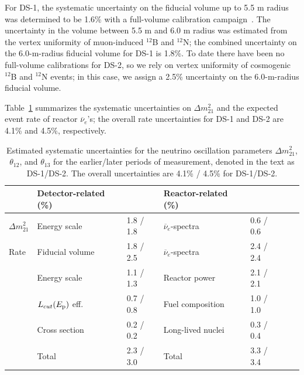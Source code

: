 \documentclass[aps,prc,twocolumn,groupedaddress,showpacs,amsmath,amssymb,floatfix,superscriptaddress]{revtex4}
\begin{document}
For \mbox{DS-1}, the systematic uncertainty on the fiducial volume up to 5.5 m radius was determined to be 1.6\% with a full-volume calibration campaign~\cite{Bruce2009}.  The uncertainty in the volume between 5.5 m and 6.0 m radius was estimated from the vertex uniformity of muon-induced $^{12}$B and $^{12}$N; the combined uncertainty on the 6.0-m-radius fiducial volume for \mbox{DS-1} is 1.8\%.  To date there have been no full-volume calibrations for \mbox{DS-2}, so we rely on vertex uniformity of cosmogenic $^{12}$B and $^{12}$N events; in this case, we assign a 2.5\% uncertainty on the 6.0-m-radius fiducial volume. 

Table~\ref{table:systematic} summarizes the systematic uncertainties on $\Delta m^{2}_{21}$ and the expected event rate of reactor $\overline{\nu}_{e}$'s; the overall rate uncertainties for \mbox{DS-1} and \mbox{DS-2} are 4.1\% and 4.5\%, respectively.

\begin{center}
\begin{table}[t]
\caption{\label{table:systematic}Estimated systematic uncertainties for the neutrino oscillation parameters $\Delta m^{2}_{21}$, $\theta_{12}$, and $\theta_{13}$ for the earlier/later periods of measurement, denoted in the text as \mbox{DS-1/DS-2}. The overall uncertainties are 4.1\% / 4.5\% for \mbox{DS-1/DS-2}.
}


 \begin{tabular}{@{}*{7}{l}}
 \hline
 \hline
  & Detector-related (\%) \hspace{-0.5cm} &  & Reactor-related (\%) \hspace{-0.5cm} & \\
 \hline
 $\Delta m^{2}_{21}$ \hspace{0.0cm} & Energy scale &  1.8 / 1.8  &  $\overline{\nu}_{e}$-spectra~\cite{Achkar1996} & \hspace{0.2cm} 0.6 / 0.6 \vspace{0.1cm}\\
 Rate \hspace{0.2cm} & Fiducial volume & 1.8 / 2.5 &  $\overline{\nu}_{e}$-spectra & \hspace{0.2cm} 2.4 / 2.4\\
  & Energy scale & 1.1 / 1.3 & Reactor power & \hspace{0.2cm} 2.1 / 2.1 \\
  & $L_{cut}(E_{\rm p})$ eff. & 0.7 / 0.8 & Fuel composition & \hspace{0.2cm} 1.0 / 1.0\\
  & Cross section & 0.2 / 0.2 & Long-lived nuclei & \hspace{0.2cm} 0.3 / 0.4\\
 & Total \hspace{0.0cm} & 2.3 / 3.0 \hspace{0.2cm} & Total &\hspace{0.2cm} 3.3 / 3.4\\
 \hline
 \hline
 \end{tabular}
 \end{table}
 \end{center}
 
\end{document}
